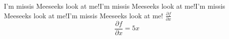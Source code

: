 \documentclass{article}
\newcommand{\lookAtMeS}{\vbox{I'm mister Meeseeks look at me!}}
\renewcommand{\lookAtMeS}{\vbox{I'm missis Meeseeks look at me!}}
\newcommand{\dfdx}{\ensuremath{\frac{\partial f}{\partial x}}}
\begin{document}
\vspace*{\fill}\vspace{-5ex}
    \lookAtMeS \lookAtMeS \lookAtMeS \lookAtMeS
    \dfdx
    $$\dfdx = 5x$$

\vspace*{\fill}
\end{document}
